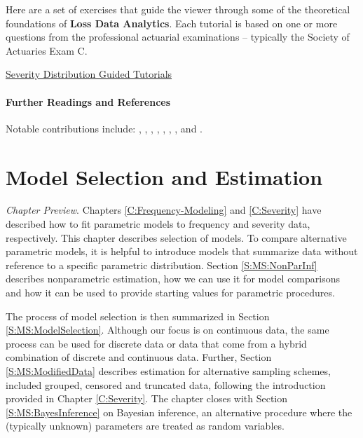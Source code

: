 \documentclass[]{book}
\theoremstyle{definition}
\theoremstyle{definition}
\theoremstyle{definition}
\theoremstyle{remark}
\begin{document}
Here are a set of exercises that guide the viewer through some of the
theoretical foundations of \textbf{Loss Data Analytics}. Each tutorial
is based on one or more questions from the professional actuarial
examinations -- typically the Society of Actuaries Exam C.

\href{http://www.ssc.wisc.edu/~jfrees/loss-data-analytics/chapter-3-modeling-loss-severity/loss-data-analytics-severity-problems/}{Severity
Distribution Guided Tutorials}

\subsubsection*{Further Readings and
References}\label{further-readings-and-references}

Notable contributions include: \citet{cummins1991managing},
\citet{frees2008hierarchical}, \citet{klugman2012},
\citet{kreer2015goodness}, \citet{mcdonald1984some},
\citet{mcdonald1995generalization}, \citet{tevet2016applying}, and
\citet{venter1983transformed}.

\chapter{Model Selection and Estimation}\label{C:ModelSelection}

\emph{Chapter Preview}. Chapters \ref{C:Frequency-Modeling} and
\ref{C:Severity} have described how to fit parametric models to
frequency and severity data, respectively. This chapter describes
selection of models. To compare alternative parametric models, it is
helpful to introduce models that summarize data without reference to a
specific parametric distribution. Section \ref{S:MS:NonParInf} describes
nonparametric estimation, how we can use it for model comparisons and
how it can be used to provide starting values for parametric procedures.

The process of model selection is then summarized in Section
\ref{S:MS:ModelSelection}. Although our focus is on continuous data, the
same process can be used for discrete data or data that come from a
hybrid combination of discrete and continuous data. Further, Section
\ref{S:MS:ModifiedData} describes estimation for alternative sampling
schemes, included grouped, censored and truncated data, following the
introduction provided in Chapter \ref{C:Severity}. The chapter closes
with Section \ref{S:MS:BayesInference} on Bayesian inference, an
alternative procedure where the (typically unknown) parameters are
treated as random variables.
\end{document}
